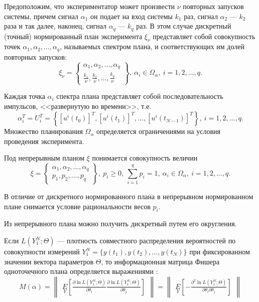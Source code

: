 \documentclass[a4paper,14pt]{extarticle}
\begin{document}
Предоположим, что экспериментатор может произвести $\nu$ повторных запусков
системы, причем сигнал $\alpha_1$ он подает на вход системы $k_1$ раз, сигнал
$\alpha_2$ --- $k_2$ раза и так далее, наконец, сигнал $\alpha_q$ --- $k_q$
раз. В этом случае дискретный (точный) нормированный план эксперимента
$\xi_{\nu}$ представляет собой совокупность точек $\alpha_1, \alpha_2, \ldots,
\alpha_q$, называемых спектром плана, и соответствующих им долей повторных
запусков:
\begin{equation*}
	\xi_{\nu} = \left\{
		\begin{array}{cc} 
			\alpha_1, \alpha_2, \ldots, \alpha_q \\
			\frac{k_1}{\nu}, \frac{k_2}{\nu}, \ldots, \frac{k_q}{\nu}
		\end{array} \right\},\ \alpha_i \in \Omega_{\alpha},\ i = 1, 2, \ldots, q.
\end{equation*}

Каждая точка $\alpha_i$ спектра плана представляет собой последовательность
импульсов, <<развернутую во времени>>, т.е.
\[
	\alpha_i^T = U_i^T = \left\{ [u^i(t_0)]^T, [u^i(t_1)]^T, \ldots,
	[u^i(t_{N-1})]^T \right\},\ i = 1, 2, \ldots, q.
\]
Множество планирования $\Omega_{\alpha}$ определяется ограничениями на условия
проведения эксперимента.

Под непрерывным планом $\xi$ понимается совокупность величин
\begin{equation*}
	\xi = \left\{
		\begin{array}{cc} 
			\alpha_1, \alpha_2, \ldots, \alpha_q \\
			p_1, p_2, \ldots, p_q	
		\end{array} \right\},\ 
	p_i \ge 0,\ 
	\sum\limits_{i=1}^q p_i = 1,\ \alpha_i \in \Omega_{\alpha},\ 
	i = 1, 2, \ldots, q.
\end{equation*}

В отличие от дискретного нормированного плана в непрерывном нормированном плане
снимается условие рациональности весов $p_i$.

Из непрерывного плана можно получить дискретный путем его округления.

Если $L(Y_1^N; \Theta)$ --- плотность совместного распределения вероятностей по
совокупности измерений $Y_1^N = \{ y(t_1), y(t_2), \ldots, y(t_N) \}$ при
фиксированном значении вектора параметров $\Theta$, то информационная матрица
Фишера одноточечного плана определяется выражениями \cite{mono}:
\begin{equation*}
	M(\alpha) = 
	\begin{Vmatrix} 
		\underset{Y}{E}
		\left[ 
			\frac{\partial \ln L(Y_1^N; \Theta)}{\partial \theta_i}
			\frac{\partial \ln L(Y_1^N; \Theta)}{\partial \theta_j}
		\right]
	\end{Vmatrix} =
	\begin{Vmatrix} 
		\underset{Y}{E}
		\left[ 
			-\frac{\partial^2 \ln L(Y_1^N; \Theta)}
			{\partial \theta_i \partial \theta_j}
		\right]
	\end{Vmatrix}
\end{equation*}
\end{document}
